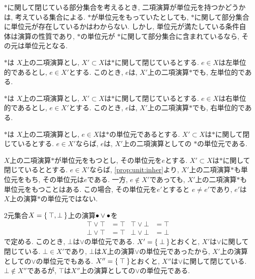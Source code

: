 $\ast$に関して閉じている部分集合を考えるとき,
二項演算が単位元を持つかどうかは,
考えている集合による.
$\ast$が単位元をもっていたとしても,
$\ast$に関して部分集合に単位元が存在しているかはわからない.
しかし,
単位元が満たしている条件自体は演算の性質であり,
$\ast$の単位元が
$\ast$に関して部分集合に含まれているなら,
その元は単位元となる.
\begin{prop}
  $\ast$は
  $X$上の二項演算とし,
  $X'\subset X$は$\ast$に関して閉じているとする.
  $e\in X$は左単位的であるとし,
  $e\in X'$とする.
  このとき,
  $e$は,
  $X'$上の二項演算$\ast$でも,
  左単位的である.
\end{prop}
\begin{prop}
  $\ast$は
  $X$上の二項演算とし,
  $X'\subset X$は$\ast$に関して閉じているとする.
  $e\in X$は右単位的であるとし,
  $e\in X'$とする.
  このとき,
  $e$は,
  $X'$上の二項演算$\ast$でも,
  右単位的である.
\end{prop}
\begin{prop}
  \label{prop:unit:inher}
  $\ast$は
  $X$上の二項演算とし,
  $e\in X$は$\ast$の単位元であるとする.
  $X'\subset X$は$\ast$に関して閉じているとする.
  $e\in X'$ならば,
  $e$は,
  $X'$上の二項演算としての
  $\ast$の単位元である.
\end{prop}
\begin{remark}
  $X$上の二項演算$\ast$が単位元をもつとし,
  その単位元を$e$とする.
  $X'\subset X$は$\ast$に関して閉じているととする.
  $e\in X'$ならば,
  \cref{prop:unit:inher}より,
  $X'$上の二項演算$\ast$も単位元をもち,
  その単位元は$e$である.
  一方, $e\not\in X'$であっても,
  $X'$上の二項演算$\ast$も単位元をもつことはある.
  この場合,
  その単位元を$e'$とすると
  $e\neq e'$であり, $e'$は$X$上の演算$\ast$の単位元ではない.
\end{remark}
\begin{example}
  $2$元集合$X=\Set{\top, \bot}$上の演算${\bullet}\lor{\bullet}$を
  \begin{align*}
   {\top \lor \top} &= \top&
   {\top \lor \bot} &= \top\\
   {\bot \lor \top} &= \top&
   {\bot \lor \bot} &= \bot    
  \end{align*}
  で定める.
  このとき, $\bot$は$\lor$の単位元である.
  $X'=\Set{\bot}$とおくと, $X'$は$\lor$に関して閉じている.
  $\bot \in X'$であり, $\bot$は$X$上の演算$\lor$の単位元であったから,
  $X'$上の演算としての$\lor$の単位元でもある.
  $X''=\Set{\top}$とおくと, $X''$は$\lor$に関して閉じている.
  $\bot\not\in X''$であるが,
  $\top$は$X''$上の演算としての$\lor$の単位元である.
\end{example}

